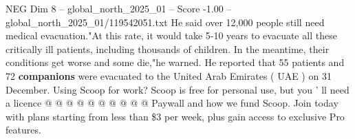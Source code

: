 \begin{textsample}{NEG Dim 8 – global\_north\_2025\_01 – Score -1.00 – global\_north\_2025\_01/119542051.txt}
He said over 12,000 people still need medical evacuation."At this rate, it would take 5-10 years to evacuate all these critically ill patients, including thousands of children.
In the meantime, their conditions get worse and some die,"he warned.
He reported that 55 patients and 72 \textbf{companions} were evacuated to the United Arab Emirates ( UAE ) on 31 December.
Using Scoop for work?
Scoop is free for personal use, but you ' ll need a licence @ @ @ @ @ @ @ @ @ @ Paywall and how we fund Scoop.
Join today with plans starting from less than \$3 per week, plus gain access to exclusive Pro features.

\end{textsample}
